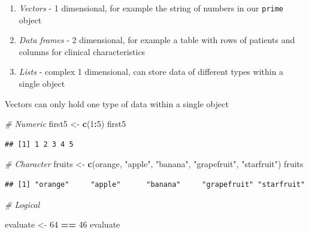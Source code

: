 \documentclass[
]{book}
\newenvironment{Shaded}{\begin{snugshade}}{\end{snugshade}}
\newcommand{\CommentTok}[1]{\textcolor[rgb]{0.56,0.35,0.01}{\textit{#1}}}
\newcommand{\DecValTok}[1]{\textcolor[rgb]{0.00,0.00,0.81}{#1}}
\newcommand{\FunctionTok}[1]{\textcolor[rgb]{0.13,0.29,0.53}{\textbf{#1}}}
\newcommand{\NormalTok}[1]{#1}
\newcommand{\OtherTok}[1]{\textcolor[rgb]{0.56,0.35,0.01}{#1}}
\newcommand{\SpecialCharTok}[1]{\textcolor[rgb]{0.81,0.36,0.00}{\textbf{#1}}}
\newcommand{\StringTok}[1]{\textcolor[rgb]{0.31,0.60,0.02}{#1}}
\providecommand{\tightlist}{%
  \setlength{\itemsep}{0pt}\setlength{\parskip}{0pt}}
\begin{document}
\begin{enumerate}
\def\labelenumi{\arabic{enumi}.}
\tightlist
\item
  \emph{Vectors} - 1 dimensional, for example the string of numbers in our \texttt{prime} object
\item
  \emph{Data frames} - 2 dimensional, for example a table with rows of patients and columns for clinical characteristics
\item
  \emph{Lists} - complex 1 dimensional, can store data of different types within a single object
\end{enumerate}

Vectors can only hold one type of data within a single object

\begin{Shaded}
\begin{Highlighting}[]
\CommentTok{\# Numeric }
\NormalTok{first5 }\OtherTok{\textless{}{-}} \FunctionTok{c}\NormalTok{(}\DecValTok{1}\SpecialCharTok{:}\DecValTok{5}\NormalTok{)}
\NormalTok{first5}
\end{Highlighting}
\end{Shaded}

\begin{verbatim}
## [1] 1 2 3 4 5
\end{verbatim}

\begin{Shaded}
\begin{Highlighting}[]
\CommentTok{\# Character }
\NormalTok{fruits }\OtherTok{\textless{}{-}} \FunctionTok{c}\NormalTok{(}\StringTok{\textquotesingle{}orange\textquotesingle{}}\NormalTok{, }\StringTok{"apple"}\NormalTok{, }\StringTok{"banana"}\NormalTok{, }\StringTok{"grapefruit"}\NormalTok{, }\StringTok{"starfruit"}\NormalTok{)}
\NormalTok{fruits}
\end{Highlighting}
\end{Shaded}

\begin{verbatim}
## [1] "orange"     "apple"      "banana"     "grapefruit" "starfruit"
\end{verbatim}

\begin{Shaded}
\begin{Highlighting}[]
\CommentTok{\# Logical}

\NormalTok{evaluate }\OtherTok{\textless{}{-}} \DecValTok{64} \SpecialCharTok{==} \DecValTok{46}
\NormalTok{evaluate}
\end{Highlighting}
\end{Shaded}
\end{document}
